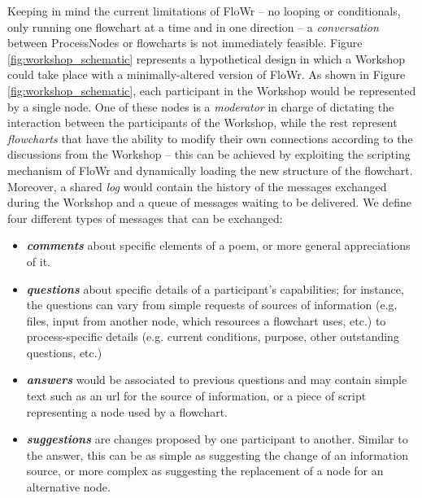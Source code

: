 Keeping in mind the current limitations of FloWr -- no looping or conditionals, only running one flowchart at a time and in one direction -- a {\em conversation} between ProcessNodes or flowcharts is not immediately feasible.  Figure \ref{fig:workshop_schematic} represents a hypothetical design in which a Workshop could take place with a minimally-altered version of FloWr. As shown in Figure \ref{fig:workshop_schematic}, each participant in the Workshop would be represented by a single node. One of these nodes is a {\em moderator} in charge of dictating the interaction between the participants of the Workshop, while the rest represent {\em flowcharts} that have the ability to modify their own connections according to the discussions from the Workshop -- this can be achieved by exploiting the scripting mechanism of FloWr and dynamically loading the new structure of the flowchart. Moreover, a shared \emph{log} would contain the history of the messages exchanged during the Workshop and a queue of messages waiting to be delivered. We define four different types of messages that can be exchanged:
\begin{itemize}
\item {\bf\em comments} about specific elements of a poem, or more general appreciations of it.
\item {\bf\em questions} about specific details of a participant's capabilities; for instance, the questions can vary from simple requests of sources of information (e.g. files, input from another node, which resources a flowchart uses, etc.) to process-specific details (e.g. current conditions, purpose, other outstanding questions, etc.)
\item {\bf\em answers} would be associated to previous questions and may contain simple text such as an url for the source of information, or a piece of script representing a node used by a flowchart.
\item {\bf\em suggestions} are changes proposed by one participant to another. Similar to the answer, this can be as simple as suggesting the change of an information source, or more complex as suggesting the replacement of a node for an alternative node.
\end{itemize}


